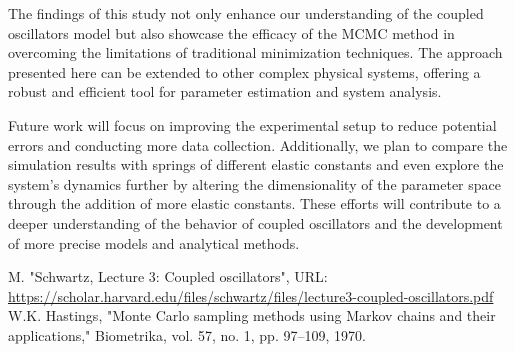 \documentclass[12pt, a4paper, reprint, nofootinbib, twoside,  showkeys]{revtex4-1}
\begin{document}
The findings of this study not only enhance our understanding of the coupled oscillators model but also showcase the efficacy of the MCMC method in overcoming the limitations of traditional minimization techniques. The approach presented here can be extended to other complex physical systems, offering a robust and efficient tool for parameter estimation and system analysis.

Future work will focus on improving the experimental setup to reduce potential errors and conducting more data collection. Additionally, we plan to compare the simulation results with springs of different elastic constants and even explore the system's dynamics further by altering the dimensionality of the parameter space through the addition of more elastic constants. These efforts will contribute to a deeper understanding of the behavior of coupled oscillators and the development of more precise models and analytical methods.


	



	
	
	\begin{thebibliography}{4}
		  M. "Schwartz, Lecture 3: Coupled oscillators", URL: \url{https://scholar.harvard.edu/files/schwartz/files/lecture3-coupled-oscillators.pdf}
		 W.K. Hastings, "Monte Carlo sampling methods using Markov chains and their applications," Biometrika, vol. 57, no. 1, pp. 97–109, 1970.

		
		
	\end{thebibliography}
	
\end{document}
